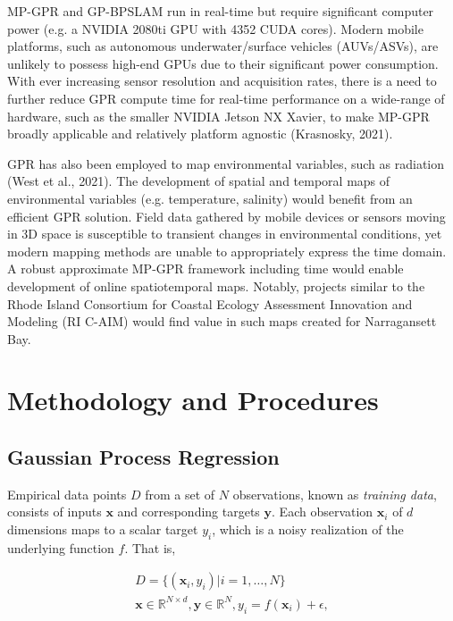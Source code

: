 \documentclass{article}
\begin{document}
MP-GPR and GP-BPSLAM run in real-time but require significant computer power (e.g. a NVIDIA 2080ti GPU with 4352 CUDA cores). Modern mobile platforms, such as autonomous underwater/surface vehicles (AUVs/ASVs), are unlikely to possess high-end GPUs due to their significant power consumption.  With ever increasing sensor resolution and acquisition rates, there is a need to further reduce GPR compute time for real-time performance on a wide-range of hardware, such as the smaller NVIDIA Jetson NX Xavier, to make MP-GPR broadly applicable and relatively platform agnostic (Krasnosky, 2021).

GPR has also been employed to map environmental variables, such as radiation (West et al., 2021). The development of spatial and temporal maps of environmental variables (e.g. temperature, salinity) would benefit from an efficient GPR solution. Field data gathered by mobile devices or sensors moving in 3D space is susceptible to transient changes in environmental conditions, yet modern mapping methods are unable to appropriately express the time domain. A robust approximate MP-GPR framework including time would enable development of online spatiotemporal maps. Notably, projects similar to the Rhode Island Consortium for Coastal Ecology Assessment Innovation and Modeling (RI C-AIM) would find value in such maps created for Narragansett Bay.



\section{Methodology and Procedures}

\subsection{Gaussian Process Regression}
Empirical data points $D$ from a set of $N$ observations, known as \textit{training data}, consists of inputs $\boldsymbol{x}$ and corresponding targets $\boldsymbol{y}$. Each observation $\boldsymbol{x}_i$ of $d$ dimensions maps to a scalar target $y_i$, which is a noisy realization of the underlying function $f$. 
That is,

\begin{gather*}
    D = \{(\boldsymbol{x}_i,y_i)|i=1,\ldots,N\} \\
    \boldsymbol{x}\in\mathbb{R}^{N \times d}, \boldsymbol{y} \in\mathbb{R}^{N}, y_i = f(\boldsymbol{x}_i) + \epsilon,
\end{gather*}
\end{document}
